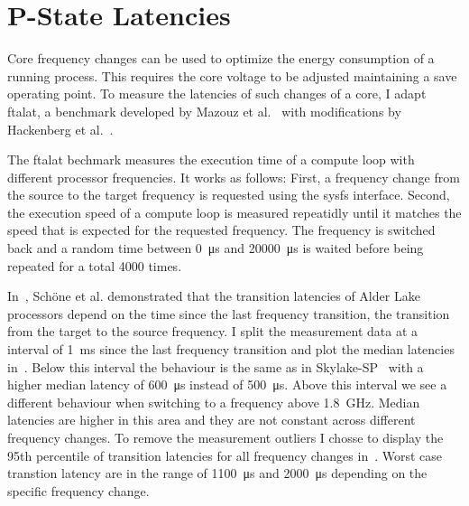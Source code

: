 

\section{P-State Latencies}
\label{sec:pstate_latencies}

Core frequency changes can be used to optimize the energy consumption of a running process.
This requires the core voltage to be adjusted maintaining a save operating point.
To measure the latencies of such changes of a core, I adapt ftalat, a benchmark developed by Mazouz et al.~\cite{Mazouz_2014_ftalat} with modifications by Hackenberg et al.~\cite{Hackenberg_2015_Haswell}.

The ftalat bechmark measures the execution time of a compute loop with different processor frequencies.
It works as follows:
First, a frequency change from the source to the target frequency is requested using the sysfs interface.
Second, the execution speed of a compute loop is measured repeatidly until it matches the speed that is expected for the requested frequency.
The frequency is switched back and a random time between \SI{0}{\us} and \SI{20000}{\us} is waited before being repeated for a total \SI{4000}{} times.

In~\cite{Schoene_2024_Alder_Lake}, Schöne et al. demonstrated that the transition latencies of Alder Lake processors depend on the time since the last frequency transition, the transition from the target to the source frequency.
I split the measurement data at a interval of \SI{1}{\ms} since the last frequency transition and plot the median latencies in~.
Below this interval the behaviour is the same as in Skylake-SP~\cite{Schoene_2019_SKL} with a higher median latency of \SI{600}{\us} instead of \SI{500}{\us}.
Above this interval we see a different behaviour when switching to a frequency above \SI{1.8}{\GHz}.
Median latencies are higher in this area and they are not constant across different frequency changes.
To remove the measurement outliers I chosse to display the 95th percentile of transition latencies for all frequency changes in~.
Worst case transtion latency are in the range of \SI{1100}{\us} and \SI{2000}{\us} depending on the specific frequency change.

